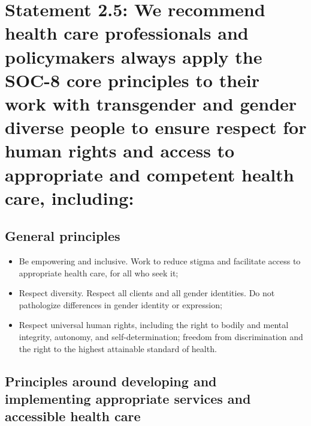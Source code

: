 \documentclass[
]{book}
\providecommand{\tightlist}{%
  \setlength{\itemsep}{0pt}\setlength{\parskip}{0pt}}
\begin{document}
\hypertarget{statement-2.5-we-recommend-health-care-professionals-and-policymakers-always-apply-the-soc-8-core-principles-to-their-work-with-transgender-and-gender-diverse-people-to-ensure-respect-for-human-rights-and-access-to-appropriate-and-competent-health-care-including}{%
\section*{Statement 2.5: We recommend health care professionals and policymakers always apply the SOC-8 core principles to their work with transgender and gender diverse people to ensure respect for human rights and access to appropriate and competent health care, including:}\label{statement-2.5-we-recommend-health-care-professionals-and-policymakers-always-apply-the-soc-8-core-principles-to-their-work-with-transgender-and-gender-diverse-people-to-ensure-respect-for-human-rights-and-access-to-appropriate-and-competent-health-care-including}}

\hypertarget{general-principles}{%
\subsection*{General principles}\label{general-principles}}

\begin{itemize}
\tightlist
\item
  Be empowering and inclusive. Work to
  reduce stigma and facilitate access to
  appropriate health care, for all who seek it;
\item
  Respect diversity. Respect all clients and
  all gender identities. Do not pathologize
  differences in gender identity or expression;
\item
  Respect universal human rights, including
  the right to bodily and mental integrity,
  autonomy, and self-determination; freedom
  from discrimination and the right to the
  highest attainable standard of health.
\end{itemize}

\hypertarget{principles-around-developing-and-implementing-appropriate-services-and-accessible-health-care}{%
\subsection*{Principles around developing and implementing appropriate services and accessible health care}\label{principles-around-developing-and-implementing-appropriate-services-and-accessible-health-care}}
\end{document}
